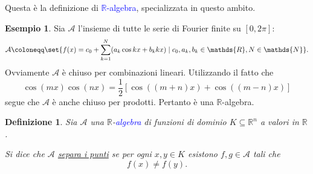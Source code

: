 \documentclass[10pt]{book}
\let\sin\relax %
\DeclareMathOperator{\sin}{sen}
\newcommand{\1}{\mathds{1}}
\newcommand{\R}{\mathds{R}}
\newcommand{\N}{\mathds{N}}
\theoremstyle{definition}%
\newtheorem{esempio}[thm]{Esempio}
\theoremstyle{plain}
\newtheorem{definizione}[thm]{Definizione}
\theoremstyle{remark}
\renewcommand{\href}[2]{\textcolor{blue}{#2}}
\begin{document}
Questa è la definizione di \href{../../../../../org/roam/20250110175552-algebra_su_un_campo.org}{\(\R\)-algebra}, specializzata in questo ambito.

\begin{esempio}
Sia \(\mathcal{A}\) l'insieme di tutte le serie di Fourier finite su \([0,2\pi]\):
\begin{equation*}
\mathcal{A} \coloneqq \set{f(x) = c_{0}+ \sum_{k=1}^{N} (a_{k}\cos kx + b_{k}\sin kx)\mid c_{0},a_{k},b_{k} \in \R, N \in\N}.
\end{equation*}
Ovviamente \(\mathcal{A}\) è chiuso per combinazioni lineari. Utilizzando il fatto che
\begin{equation*}
\cos(mx)\cos(nx) = \frac{1}{2}\left[\cos((m+n)x) + \cos((m-n)x)\right]
\end{equation*}
segue che \(\mathcal{A}\) è anche chiuso per prodotti. Pertanto è una \(\R\)-algebra.
\end{esempio}
\begin{definizione}
Sia \(\mathcal{A}\) una \(\R\)-\href{../../../../../org/roam/20250110175552-algebra_su_un_campo.org}{algebra} di funzioni di dominio \(K \subseteq \R^{n}\) a valori in \(\R\).

Si dice che \(\mathcal{A}\) \uline{separa i punti} se per ogni \(x,y \in K\) esistono \(f,g \in \mathcal{A}\) tali che
\begin{equation*}
f(x) \neq f(y).
\end{equation*}
\end{definizione}
\end{document}

